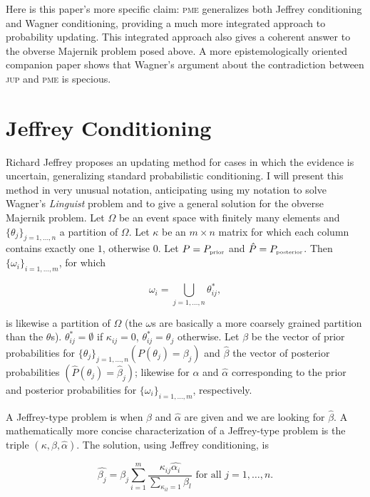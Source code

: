 \documentclass[11pt]{article}
\begin{document}
Here is this paper's more specific claim: \textsc{pme} generalizes
both Jeffrey conditioning and Wagner conditioning, providing a much
more integrated approach to probability updating. This integrated
approach also gives a coherent answer to the obverse Majernik problem
posed above. A more epistemologically oriented companion paper shows
that Wagner's argument about the contradiction between \textsc{jup}
and \textsc{pme} is specious.

\section{Jeffrey Conditioning}
\label{jc}

Richard Jeffrey proposes an updating method for cases in which the
evidence is uncertain, generalizing standard probabilistic
conditioning. I will present this method in very unusual notation,
anticipating using my notation to solve Wagner's \emph{Linguist}
problem and to give a general solution for the obverse Majernik
problem. Let $\Omega$ be an event space with finitely many elements
and $\{\theta_{j}\}_{j=1,\ldots,n}$ a partition of $\Omega$. Let
$\kappa$ be an $m\times{}n$ matrix for which each column contains
exactly one $1$, otherwise $0$. Let $P=P_{\mbox{\tiny{prior}}}$ and
$\hat{P}=P_{\mbox{\tiny{posterior}}}$. Then
$\{\omega_{i}\}_{i=1,\ldots,m}$, for which

\begin{equation}
  \label{eq:m1}
  \omega_{i}=\bigcup_{j=1,\dots,n}\theta^{*}_{ij},
\end{equation}

is likewise a partition of $\Omega$ (the $\omega$s are basically a
more coarsely grained partition than the $\theta$s).
$\theta^{*}_{ij}=\emptyset$ if $\kappa_{ij}=0$,
$\theta^{*}_{ij}=\theta_{j}$ otherwise. Let $\beta$ be the vector of
prior probabilities for $\{\theta_{j}\}_{j=1,\ldots,n}
(P(\theta_{j})=\beta_{j})$ and $\hat{\beta}$ the vector of posterior
probabilities $(\hat{P}(\theta_{j})=\hat{\beta}_{j})$; likewise for
$\alpha$ and $\hat{\alpha}$ corresponding to the prior and posterior
probabilities for $\{\omega_{i}\}_{i=1,\ldots,m}$, respectively.

A Jeffrey-type problem is when $\beta$ and $\hat{\alpha}$ are given
and we are looking for $\hat{\beta}$. A mathematically more concise
characterization of a Jeffrey-type problem is the triple
$(\kappa,\beta,\hat{\alpha})$. The solution, using Jeffrey
conditioning, is

\begin{equation}
  \label{eq:m2}
  \hat{\beta_{j}}=\beta_{j}\sum_{i=1}^{m}\frac{\kappa_{ij}\hat{\alpha_{i}}}{\sum_{\kappa_{il}=1}\beta_{l}}\mbox{ for all }j=1,\ldots,n.
\end{equation}
\end{document}
